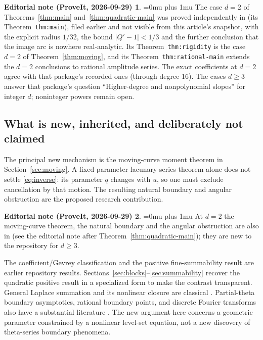 \documentclass[11pt,a4paper]{article}
\numberwithin{equation}{section}
\theoremstyle{definition}\newtheorem{definition}[theorem]{Definition}
\theoremstyle{remark}\newtheorem{remark}[theorem]{Remark}
\theoremstyle{definition}
\newtheorem*{ednoteinner}{Editorial note (ProveIt, 2026-09-29)}
\newenvironment{ednote}{\begin{ednoteinner}\sloppy\Urlmuskip=0mu plus 1mu\relax}{\end{ednoteinner}}
\begin{document}
\begin{ednote}
The case $d=2$ of Theorems~\ref{thm:main} and~\ref{thm:quadratic-main} was
proved independently in
 \cite{ed:nbq} (its
Theorem~\texttt{thm:main}), filed earlier and not visible from this
article's snapshot, with the explicit radius $1/32$, the bound
$|Q'-1|<1/3$ and the further conclusion that the image arc is nowhere
real-analytic. Its Theorem~\texttt{thm:rigidity} is the case $d=2$ of
Theorem~\ref{thm:moving}, and its Theorem~\texttt{thm:rational-main} extends
the $d=2$ conclusions to rational amplitude series. The exact coefficients
at $d=2$ agree with that package's recorded ones (through degree 16). The cases $d\ge3$ answer
that package's question ``Higher-degree and nonpolynomial slopes'' for
integer $d$; noninteger powers remain open.
\end{ednote}

\subsection{What is new, inherited, and deliberately not claimed}
The principal new mechanism is the moving-curve moment theorem in
Section~\ref{sec:moving}. A fixed-parameter lacunary-series theorem alone does
not settle \eqref{eq:inverse}: its parameter $q$ changes with $u$, so one must
exclude cancellation by that motion. The resulting natural boundary and
angular obstruction are the proposed research contribution.
\begin{ednote}
At $d=2$ the moving-curve theorem, the natural boundary and the angular
obstruction are also in \cite{ed:nbq} (see the editorial note after
Theorem~\ref{thm:quadratic-main}); they are new to the repository for
$d\ge3$.
\end{ednote}

The coefficient/Gevrey classification and the positive fine-summability
result are earlier repository results. Sections~\ref{sec:blocks}--\ref{sec:summability}
recover the quadratic positive result in a specialized form to make the
contrast transparent. General Laplace summation and its nonlinear closure are
classical \cite{sokal,sauzin}. Partial-theta boundary asymptotics, rational
boundary points, and discrete Fourier transforms also have a substantial
literature \cite{hlss,folsom}. The new argument here concerns a geometric
parameter constrained by a nonlinear level-set equation, not a new discovery
of theta-series boundary phenomena.
\end{document}
